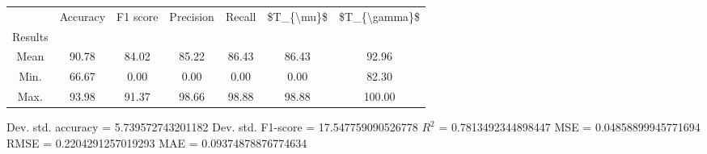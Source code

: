 \begin{tabular}{|c|c|c|c|c|c|c|}
\toprule
{} &  Accuracy &  F1 score &  Precision &  Recall &  \$T\_\{\textbackslash mu\}\$ &  \$T\_\{\textbackslash gamma\}\$ \\
Results &           &           &            &         &            &               \\
\hline
Mean    &     90.78 &     84.02 &      85.22 &   86.43 &      86.43 &         92.96 \\
Min.    &     66.67 &      0.00 &       0.00 &    0.00 &       0.00 &         82.30 \\
Max.    &     93.98 &     91.37 &      98.66 &   98.88 &      98.88 &        100.00 \\
\bottomrule
\end{tabular}

 Dev. std. accuracy = 5.739572743201182
 Dev. std. F1-score = 17.547759090526778
 $R^2$ = 0.7813492344898447
 MSE = 0.04858899945771694
 RMSE = 0.2204291257019293
 MAE = 0.09374878876774634